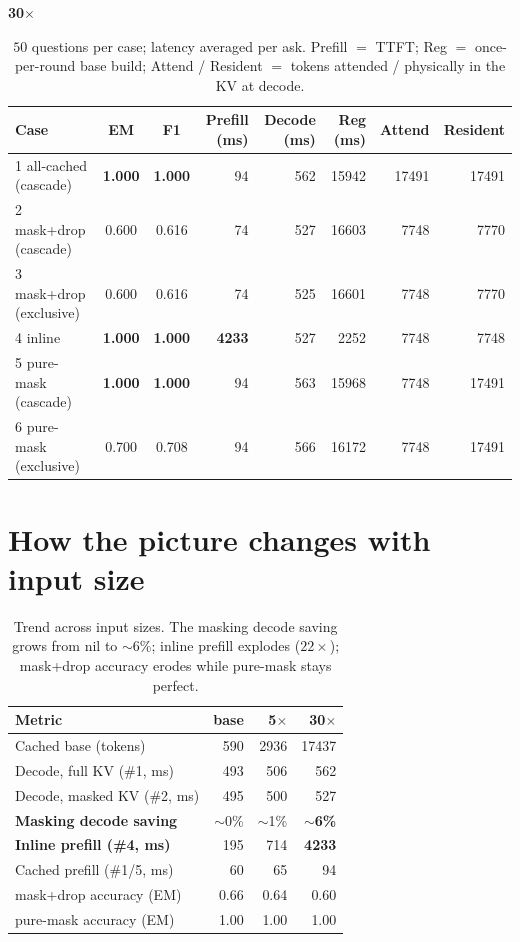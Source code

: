 \documentclass[11pt]{article}
\begin{document}
\begin{table}[h]
\vspace{0.8em}
\textbf{30$\times$}\\[2pt]
\begin{tabular}{@{}l c c r r r r r@{}}
\toprule
Case & EM & F1 & Prefill (ms) & Decode (ms) & Reg (ms) & Attend & Resident \\
\midrule
1 all-cached (cascade)  & \textbf{1.000} & \textbf{1.000} & 94   & 562 & 15942 & 17491 & 17491 \\
2 mask+drop (cascade)   & 0.600 & 0.616 & 74   & 527 & 16603 & 7748  & 7770  \\
3 mask+drop (exclusive) & 0.600 & 0.616 & 74   & 525 & 16601 & 7748  & 7770  \\
4 inline                & \textbf{1.000} & \textbf{1.000} & \textbf{4233} & 527 & 2252  & 7748  & 7748  \\
5 pure-mask (cascade)   & \textbf{1.000} & \textbf{1.000} & 94   & 563 & 15968 & 7748  & 17491 \\
6 pure-mask (exclusive) & 0.700 & 0.708 & 94   & 566 & 16172 & 7748  & 17491 \\
\bottomrule
\end{tabular}
\caption{$50$ questions per case; latency averaged per ask. Prefill $=$ TTFT;
Reg $=$ once-per-round base build; Attend / Resident $=$ tokens attended /
physically in the KV at decode.}
\label{tab:results}
\end{table}

\section{How the picture changes with input size}
\begin{table}[h]
\centering
\renewcommand{\arraystretch}{1.15}
\begin{tabular}{@{}l r r r@{}}
\toprule
Metric & base & 5$\times$ & 30$\times$ \\
\midrule
Cached base (tokens)                 & 590  & 2936 & 17437 \\
Decode, full KV (\#1, ms)            & 493  & 506  & 562   \\
Decode, masked KV (\#2, ms)          & 495  & 500  & 527   \\
\textbf{Masking decode saving}       & $\sim$0\% & $\sim$1\% & \textbf{$\sim$6\%} \\
\textbf{Inline prefill (\#4, ms)}    & 195  & 714  & \textbf{4233} \\
Cached prefill (\#1/5, ms)           & 60   & 65   & 94    \\
mask+drop accuracy (EM)              & 0.66 & 0.64 & 0.60  \\
pure-mask accuracy (EM)              & 1.00 & 1.00 & 1.00  \\
\bottomrule
\end{tabular}
\caption{Trend across input sizes. The masking decode saving grows from nil to
$\sim$6\%; inline prefill explodes ($22\times$); mask+drop accuracy erodes while
pure-mask stays perfect.}
\label{tab:trend}
\end{table}
\end{document}
